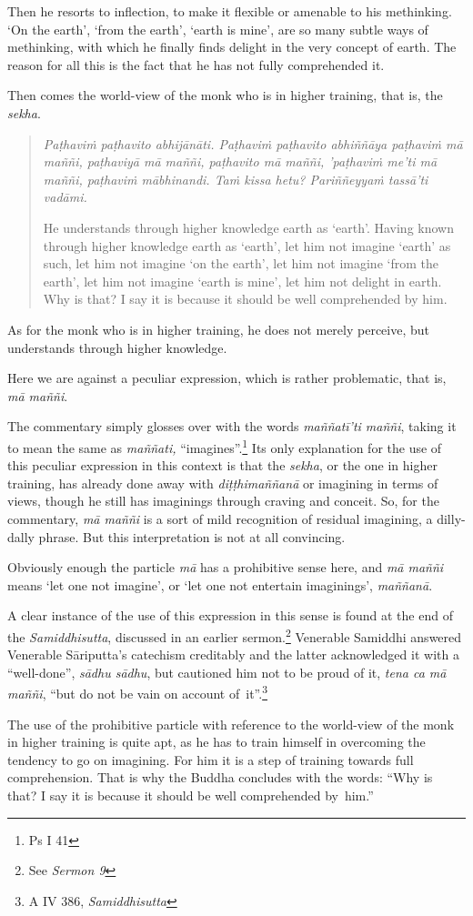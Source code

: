 Then he resorts to inflection, to make it flexible or amenable to his methinking. `On the earth', `from the earth', `earth is mine', are so many subtle ways of methinking, with which he finally finds delight in the very concept of earth. The reason for all this is the fact that he has not fully comprehended it.

Then comes the world-view of the monk who is in higher training, that is, the \emph{sekha}.

\begin{quote}
\emph{Paṭhaviṁ paṭhavito abhijānāti. Paṭhaviṁ paṭhavito abhiññāya paṭhaviṁ mā maññi, paṭhaviyā mā maññi, paṭhavito mā maññi, 'paṭhaviṁ me'ti mā maññi, paṭhaviṁ mābhinandi. Taṁ kissa hetu? Pariññeyyaṁ tassā'ti vadāmi.}

He understands through higher knowledge earth as `earth'. Having known through higher knowledge earth as `earth', let him not imagine `earth' as such, let him not imagine `on the earth', let him not imagine `from the earth', let him not imagine `earth is mine', let him not delight in earth. Why is that? I say it is because it should be well comprehended by him.
\end{quote}

As for the monk who is in higher training, he does not merely perceive, but understands through higher knowledge.

Here we are against a peculiar expression, which is rather problematic, that is, \emph{mā maññi}.

The commentary simply glosses over with the words \emph{maññatī'ti maññi}, taking it to mean the same as \emph{maññati,} ``imagines''.\footnote{Ps I 41} Its only explanation for the use of this peculiar expression in this context is that the \emph{sekha}, or the one in higher training, has already done away with \emph{diṭṭhimaññanā} or imagining in terms of views, though he still has imaginings through craving and conceit. So, for the commentary, \emph{mā maññi} is a sort of mild recognition of residual imagining, a dilly-dally phrase. But this interpretation is not at all convincing.

Obviously enough the particle \emph{mā} has a prohibitive sense here, and \emph{mā maññi} means `let one not imagine', or `let one not entertain imaginings', \emph{maññanā}.

A clear instance of the use of this expression in this sense is found at the end of the \emph{Samiddhisutta}, discussed in an earlier sermon.\footnote{See \emph{Sermon 9}} Venerable Samiddhi answered Venerable Sāriputta's catechism creditably and the latter acknowledged it with a ``well-done'', \emph{sādhu sādhu}, but cautioned him not to be proud of it, \emph{tena ca mā maññi}, ``but do not be vain on account of~it''.\footnote{A IV 386, \emph{Samiddhisutta}}

The use of the prohibitive particle with reference to the world-view of the monk in higher training is quite apt, as he has to train himself in overcoming the tendency to go on imagining. For him it is a step of training towards full comprehension. That is why the Buddha concludes with the words: ``Why is that? I say it is because it should be well comprehended by~him.''
